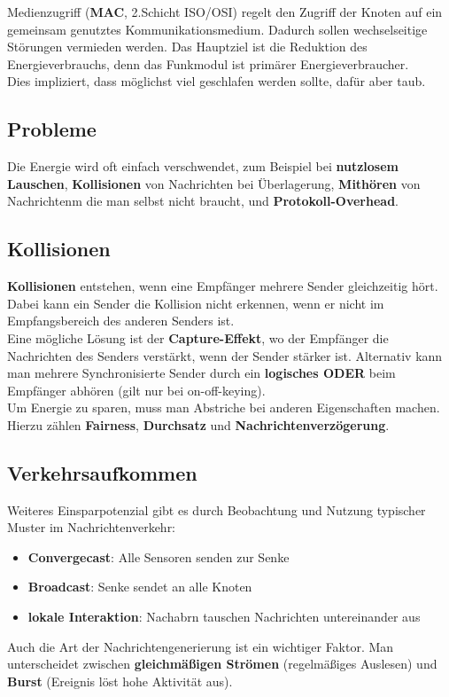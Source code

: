 \documentclass[a4paper]{article}
\begin{document}
Medienzugriff (\textbf{MAC}, 2.Schicht ISO/OSI) regelt den Zugriff der Knoten auf ein gemeinsam genutztes Kommunikationsmedium. Dadurch sollen wechselseitige Störungen vermieden werden. Das Hauptziel ist die Reduktion des Energieverbrauchs, denn das Funkmodul ist primärer Energieverbraucher.	\\

Dies impliziert, dass möglichst viel geschlafen werden sollte, dafür aber taub.
\subsection{Probleme}
Die Energie wird oft einfach verschwendet, zum Beispiel bei \textbf{nutzlosem Lauschen}, \textbf{Kollisionen} von Nachrichten bei Überlagerung, \textbf{Mithören} von Nachrichtenm die man selbst nicht braucht, und \textbf{Protokoll-Overhead}.\\

\subsection{Kollisionen}
\textbf{Kollisionen} entstehen, wenn eine Empfänger mehrere Sender gleichzeitig hört. Dabei kann ein Sender die Kollision nicht erkennen, wenn er nicht im Empfangsbereich des anderen Senders ist.\\

Eine mögliche Lösung ist der \textbf{Capture-Effekt}, wo der Empfänger die Nachrichten des Senders verstärkt, wenn der Sender stärker ist. Alternativ kann man mehrere Synchronisierte Sender durch ein \textbf{logisches ODER} beim Empfänger abhören (gilt nur bei on-off-keying).\\

Um Energie zu sparen, muss man Abstriche bei anderen Eigenschaften machen. Hierzu zählen \textbf{Fairness}, \textbf{Durchsatz} und \textbf{Nachrichtenverzögerung}.

\subsection{Verkehrsaufkommen}
Weiteres Einsparpotenzial gibt es durch Beobachtung und Nutzung typischer Muster im Nachrichtenverkehr:
\begin{itemize}
	\item \textbf{Convergecast}: Alle Sensoren senden zur Senke
	\item \textbf{Broadcast}: Senke sendet an alle Knoten
	\item \textbf{lokale Interaktion}: Nachabrn tauschen Nachrichten untereinander aus
\end{itemize}
Auch die Art der Nachrichtengenerierung ist ein wichtiger Faktor. Man unterscheidet zwischen \textbf{gleichmäßigen Strömen} (regelmäßiges Auslesen) und \textbf{Burst} (Ereignis löst hohe Aktivität aus).
\end{document}
